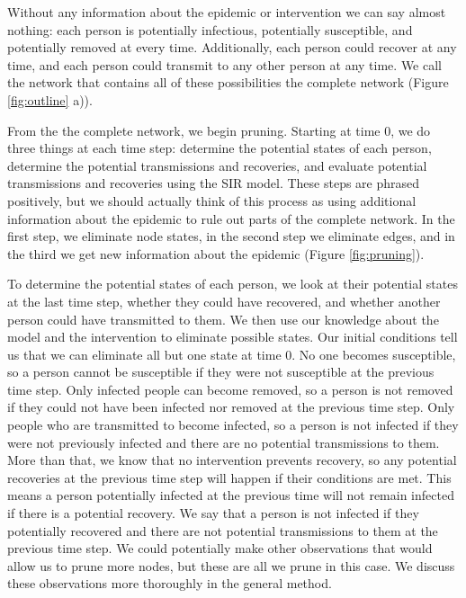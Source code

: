 \documentclass[PTRSB]{rsos}
\begin{document}
\begin{multicols}{2}
Without any information about the epidemic or intervention we can say almost nothing: each person is potentially infectious, potentially susceptible, and potentially removed at every time.
Additionally, each person could recover at any time, and each person could transmit to any other person at any time.
We call the network that contains all of these possibilities the complete network (Figure \ref{fig:outline} a)).

From the the complete network, we begin pruning.
Starting at time $0$, we do three things at each time step: determine the potential states of each person, determine the potential transmissions and recoveries, and evaluate potential transmissions and recoveries using the SIR model.
These steps are phrased positively, but we should actually think of this process as using additional information about the epidemic to rule out parts of the complete network.
In the first step, we eliminate node states, in the second step we eliminate edges, and in the third we get new information about the epidemic (Figure \ref{fig:pruning}).

To determine the potential states of each person, we look at their potential states at the last time step, whether they could have recovered, and whether another person could have transmitted to them.
We then use our knowledge about the model and the intervention to eliminate possible states.
Our initial conditions tell us that we can eliminate all but one state at time $0$.
No one becomes susceptible, so a person cannot be susceptible if they were not susceptible at the previous time step. %
Only infected people can become removed, so a person is not removed if they could not have been infected nor removed at the previous time step.
Only people who are transmitted to become infected, so a person is not infected if they were not previously infected and there are no potential transmissions to them.
More than that, we know that no intervention prevents recovery, so any potential recoveries at the previous time step will happen if their conditions are met.
This means a person potentially infected at the previous time will not remain infected if there is a potential recovery.
We say that a person is not infected if they potentially recovered and there are not potential transmissions to them at the previous time step.
We could potentially make other observations that would allow us to prune more nodes, but these are all we prune in this case.
We discuss these observations more thoroughly in the general method.


\end{multicols}
\end{document}
